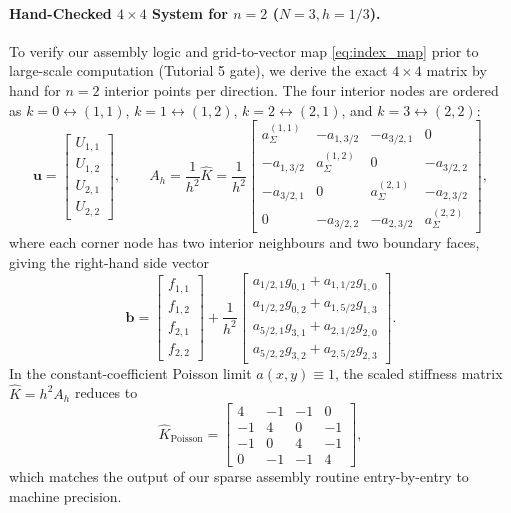 \documentclass[11pt,a4paper]{article}
\theoremstyle{definition}
\theoremstyle{remark}
\begin{document}
\paragraph{Hand-Checked $4 \times 4$ System for $n = 2$ ($N = 3, h = 1/3$).}
To verify our assembly logic and grid-to-vector map \eqref{eq:index_map} prior to large-scale computation (Tutorial 5 gate), we derive the exact $4 \times 4$ matrix by hand for $n = 2$ interior points per direction. The four interior nodes are ordered as $k=0 \leftrightarrow (1,1)$, $k=1 \leftrightarrow (1,2)$, $k=2 \leftrightarrow (2,1)$, and $k=3 \leftrightarrow (2,2)$:
\begin{equation}
    \bm{u} = \begin{bmatrix} U_{1,1} \\ U_{1,2} \\ U_{2,1} \\ U_{2,2} \end{bmatrix}, \qquad
    A_h = \frac{1}{h^2}\hat{K} = \frac{1}{h^2}
    \begin{bmatrix}
        a_\Sigma^{(1,1)} & -a_{1,3/2} & -a_{3/2,1} & 0 \\[1.5mm]
        -a_{1,3/2} & a_\Sigma^{(1,2)} & 0 & -a_{3/2,2} \\[1.5mm]
        -a_{3/2,1} & 0 & a_\Sigma^{(2,1)} & -a_{2,3/2} \\[1.5mm]
        0 & -a_{3/2,2} & -a_{2,3/2} & a_\Sigma^{(2,2)}
    \end{bmatrix},
    \label{eq:hand_matrix_var}
\end{equation}
where each corner node has two interior neighbours and two boundary faces, giving the right-hand side vector
\begin{equation}
    \bm{b} = \begin{bmatrix} f_{1,1} \\ f_{1,2} \\ f_{2,1} \\ f_{2,2} \end{bmatrix}
    + \frac{1}{h^2}
    \begin{bmatrix}
        a_{1/2,1}g_{0,1} + a_{1,1/2}g_{1,0} \\[1mm]
        a_{1/2,2}g_{0,2} + a_{1,5/2}g_{1,3} \\[1mm]
        a_{5/2,1}g_{3,1} + a_{2,1/2}g_{2,0} \\[1mm]
        a_{5/2,2}g_{3,2} + a_{2,5/2}g_{2,3}
    \end{bmatrix}.
    \label{eq:hand_rhs_var}
\end{equation}
In the constant-coefficient Poisson limit $a(x,y) \equiv 1$, the scaled stiffness matrix $\hat{K} = h^2 A_h$ reduces to
\begin{equation}
    \hat{K}_{\text{Poisson}} =
    \begin{bmatrix}
        4 & -1 & -1 & 0 \\
        -1 & 4 & 0 & -1 \\
        -1 & 0 & 4 & -1 \\
        0 & -1 & -1 & 4
    \end{bmatrix},
    \label{eq:hand_matrix_poisson}
\end{equation}
which matches the output of our sparse assembly routine entry-by-entry to machine precision.
\end{document}

